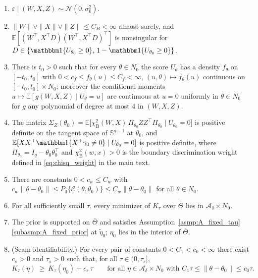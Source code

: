 \documentclass[10pt,a4paper]{amsart}
\newcommand{\E}{\mathbb{E}}
\begin{document}
\begin{assumption}
\label{asmp:V}
\leavevmode
\begin{enumerate}[label=(\roman*),nosep]
\item \label{subasmp:V_gauss} $\varepsilon\mid(W,X,Z)\sim\mathcal N(0,\sigma_0^2)$.
\item \label{subasmp:V_bounded} $\|W\|\vee\|X\|\vee\|Z\|\le C_B<\infty$ almost surely, and $\E[(W^\top,X^\top D)(W^\top,X^\top D)^\top]$ is nonsingular for $D\in\{\mathbbm 1\{U_{\theta_0}\ge0\},\,1-\mathbbm 1\{U_{\theta_0}\ge0\}\}$.
\item \label{subasmp:V_margin} There is $t_0>0$ such that for every $\theta\in N_0$ the score $U_\theta$ has a density $f_\theta$ on $[-t_0,t_0]$ with
$0<c_f\le f_\theta(u)\le C_f<\infty$, $(u,\theta)\mapsto f_\theta(u)$ continuous on $[-t_0,t_0]\times N_0$; moreover the conditional moments
$u\mapsto\E[g(W,X,Z)\mid U_\theta=u]$ are continuous at $u=0$ uniformly in $\theta\in N_0$ for $g$ any polynomial of degree at most $4$ in $(W,X,Z)$.
\item \label{subasmp:V_boundary_info} The matrix $\Sigma_Z(\theta_0)=\E\big[\chi^2_{\mathrm B}(W,X)\,\Pi_{\theta_0}ZZ^\top\Pi_{\theta_0}\mid U_{\theta_0}=0\big]$ is positive definite on the tangent space of $\mathbb S^{q-1}$ at $\theta_0$, and $\E[XX^\top\mathbbm 1\{X^\top\gamma_0\neq0\}\mid U_{\theta_0}=0]$ is positive definite, where $\Pi_{\theta_0}=I_q-\theta_0\theta_0^\top$ and $\chi^2_{\mathrm B}(w,x)>0$ is the boundary discrimination weight defined in \eqref{eq:chisq_weight} in the main text.
\item \label{subasmp:V_wedge} There are constants $0<c_w\le C_w$ with
$c_w\|\theta-\theta_0\|\le P_0\{\mathcal E(\theta,\theta_0)\}\le C_w\|\theta-\theta_0\|$ for all $\theta\in N_0$.
\item \label{subasmp:V_anchor} For all sufficiently small $\tau$, every minimizer of $K_\tau$ over $\bar\Theta$ lies in $\mathcal A_\delta\times N_0$.
\item \label{subasmp:V_prior} The prior is supported on $\bar\Theta$ and satisfies Assumption~\ref{asmp:A_fixed_tau}\ref{subasmp:A_fixed_prior} at $\tilde\eta_0$; $\eta_0$ lies in the interior of $\bar\Theta$.
\item \label{subasmp:V_seam} (Seam identifiability.) For every pair of constants $0<C_1<c_0<\infty$ there exist $c_s>0$ and $\tau_s>0$ such that, for all $\tau\in(0,\tau_s]$,
\[
K_\tau(\eta)\ \ge\ K_\tau(\eta_0)+c_s\,\tau
\qquad\text{for all }\eta\in\mathcal A_\delta\times N_0\text{ with }C_1\tau\le\|\theta-\theta_0\|\le c_0\tau .
\]
\end{enumerate}
\end{assumption}
\end{document}

